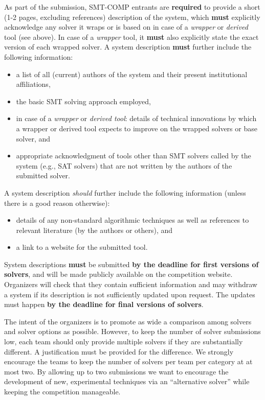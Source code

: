 \documentclass[12pt]{article}
\begin{document}
%
As part of the submission, SMT-COMP entrants are \textbf{required} to provide a
short (1-2 pages, excluding references) description of the system, which \textbf{must} explicitly
acknowledge any solver it wraps or is based on in case of a \emph{wrapper} or
\emph{derived} tool (see above).
In case of a \emph{wrapper} tool, it \textbf{must} also explicitly state
the exact version of each wrapped solver.
A system description \textbf{must} further include the following information:
\begin{itemize}[itemsep=0ex]
  \item a list of all (current) authors of the system and their present institutional
    affiliations,
  \item the basic SMT solving approach employed,
  \item in case of a \emph{wrapper} or \emph{derived tool}: details of
    technical innovations by which a wrapper or derived tool expects to improve
    on the wrapped solvers or base solver, and
  \item appropriate acknowledgment of tools other than SMT solvers called by
    the system (e.g., SAT solvers) that are not written by the authors of the
    submitted solver.
\end{itemize}
A system description \emph{should} further include the following information
(unless there is a good reason otherwise):
\begin{itemize}[itemsep=0ex]
  \item details of any non-standard algorithmic techniques as well as
    references to relevant literature (by the authors or others), and
  \item a link to a website for the submitted tool.
\end{itemize}
System descriptions \textbf{must} be submitted \textbf{by the deadline for first versions
of solvers}, and will be made publicly available on the competition website.
Organizers will check that they contain sufficient information
and may withdraw a system if its description is not sufficiently updated upon
request. The updates must happen \textbf{by the deadline for final versions of solvers}.

%
The intent of the organizers is to promote as wide a comparison among
solvers and solver options as possible.  However, to keep the number of
solver submissions low, each team should only provide multiple solvers
if they are  substantially different.  A justification must be provided
for the difference.  We strongly encourage the teams to keep the number
of solvers per team per category at at most two. By allowing
up to two submissions we want to encourage the development of new,
experimental techniques via an ``alternative solver'' while keeping
the competition manageable.
\end{document}
